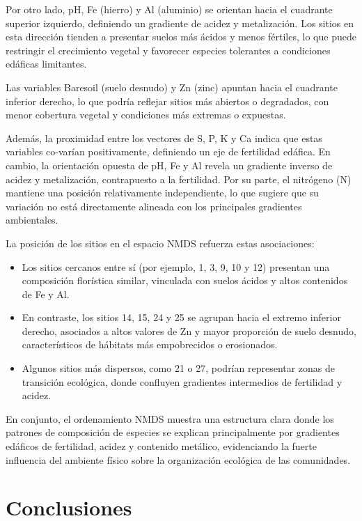 \documentclass[
  spanish,
  11pt,
  a4paper,
  DIV=11,
  numbers=noendperiod]{scrartcl}
\begin{document}
Por otro lado, pH, Fe (hierro) y Al (aluminio) se orientan hacia el
cuadrante superior izquierdo, definiendo un gradiente de acidez y
metalización. Los sitios en esta dirección tienden a presentar suelos
más ácidos y menos fértiles, lo que puede restringir el crecimiento
vegetal y favorecer especies tolerantes a condiciones edáficas
limitantes.

Las variables Baresoil (suelo desnudo) y Zn (zinc) apuntan hacia el
cuadrante inferior derecho, lo que podría reflejar sitios más abiertos o
degradados, con menor cobertura vegetal y condiciones más extremas o
expuestas.

Además, la proximidad entre los vectores de S, P, K y Ca indica que
estas variables co-varían positivamente, definiendo un eje de fertilidad
edáfica. En cambio, la orientación opuesta de pH, Fe y Al revela un
gradiente inverso de acidez y metalización, contrapuesto a la
fertilidad. Por su parte, el nitrógeno (N) mantiene una posición
relativamente independiente, lo que sugiere que su variación no está
directamente alineada con los principales gradientes ambientales.

La posición de los sitios en el espacio NMDS refuerza estas
asociaciones:

\begin{itemize}
\item
  Los sitios cercanos entre sí (por ejemplo, 1, 3, 9, 10 y 12) presentan
  una composición florística similar, vinculada con suelos ácidos y
  altos contenidos de Fe y Al.
\item
  En contraste, los sitios 14, 15, 24 y 25 se agrupan hacia el extremo
  inferior derecho, asociados a altos valores de Zn y mayor proporción
  de suelo desnudo, característicos de hábitats más empobrecidos o
  erosionados.
\item
  Algunos sitios más dispersos, como 21 o 27, podrían representar zonas
  de transición ecológica, donde confluyen gradientes intermedios de
  fertilidad y acidez.
\end{itemize}

En conjunto, el ordenamiento NMDS muestra una estructura clara donde los
patrones de composición de especies se explican principalmente por
gradientes edáficos de fertilidad, acidez y contenido metálico,
evidenciando la fuerte influencia del ambiente físico sobre la
organización ecológica de las comunidades.

\section{Conclusiones}\label{conclusiones}
\end{document}
